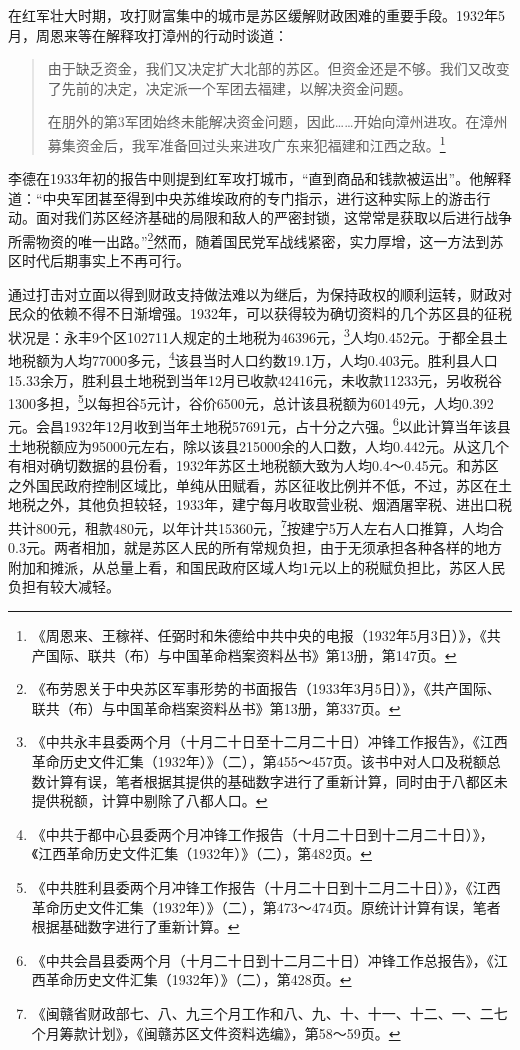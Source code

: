在红军壮大时期，攻打财富集中的城市是苏区缓解财政困难的重要手段。1932年5月，周恩来等在解释攻打漳州的行动时谈道：

\begin{quote}

由于缺乏资金，我们又决定扩大北部的苏区。但资金还是不够。我们又改变了先前的决定，决定派一个军团去福建，以解决资金问题。

在朋外的第3军团始终未能解决资金问题，因此……开始向漳州进攻。在漳州募集资金后，我军准备回过头来进攻广东来犯福建和江西之敌。\footnote{《周恩来、王稼祥、任弼时和朱德给中共中央的电报（1932年5月3日）》，《共产国际、联共（布）与中国革命档案资料丛书》第13册，第147页。}
\end{quote}


李德在1933年初的报告中则提到红军攻打城市，“直到商品和钱款被运出”。他解释道：“中央军团甚至得到中央苏维埃政府的专门指示，进行这种实际上的游击行动。面对我们苏区经济基础的局限和敌人的严密封锁，这常常是获取以后进行战争所需物资的唯一出路。”\footnote{《布劳恩关于中央苏区军事形势的书面报告（1933年3月5日）》，《共产国际、联共（布）与中国革命档案资料丛书》第13册，第337页。}然而，随着国民党军战线紧密，实力厚增，这一方法到苏区时代后期事实上不再可行。


通过打击对立面以得到财政支持做法难以为继后，为保持政权的顺利运转，财政对民众的依赖不得不日渐增强。1932年，可以获得较为确切资料的几个苏区县的征税状况是：永丰9个区102711人规定的土地税为46396元，\footnote{《中共永丰县委两个月（十月二十日至十二月二十日）冲锋工作报告》，《江西革命历史文件汇集（1932年）》（二），第455～457页。该书中对人口及税额总数计算有误，笔者根据其提供的基础数字进行了重新计算，同时由于八都区未提供税额，计算中剔除了八都人口。}人均0.452元。于都全县土地税额为人均77000多元，\footnote{《中共于都中心县委两个月冲锋工作报告（十月二十日到十二月二十日）》，《江西革命历史文件汇集（1932年）》（二），第482页。}该县当时人口约数19.1万，人均0.403元。胜利县人口15.33余万，胜利县土地税到当年12月已收款42416元，未收款11233元，另收税谷1300多担，\footnote{《中共胜利县委两个月冲锋工作报告（十月二十日到十二月二十日）》，《江西革命历史文件汇集（1932年）》（二），第473～474页。原统计计算有误，笔者根据基础数字进行了重新计算。}以每担谷5元计，谷价6500元，总计该县税额为60149元，人均0.392元。会昌1932年12月收到当年土地税57691元，占十分之六强。\footnote{《中共会昌县委两个月（十月二十日到十二月二十日）冲锋工作总报告》，《江西革命历史文件汇集（1932年）》（二），第428页。}以此计算当年该县土地税额应为95000元左右，除以该县215000余的人口数，人均0.442元。从这几个有相对确切数据的县份看，1932年苏区土地税额大致为人均0.4～0.45元。和苏区之外国民政府控制区域比，单纯从田赋看，苏区征收比例并不低，不过，苏区在土地税之外，其他负担较轻，1933年，建宁每月收取营业税、烟酒屠宰税、进出口税共计800元，租款480元，以年计共15360元，\footnote{《闽赣省财政部七、八、九三个月工作和八、九、十、十一、十二、一、二七个月筹款计划》，《闽赣苏区文件资料选编》，第58～59页。}按建宁5万人左右人口推算，人均合0.3元。两者相加，就是苏区人民的所有常规负担，由于无须承担各种各样的地方附加和摊派，从总量上看，和国民政府区域人均1元以上的税赋负担比，苏区人民负担有较大减轻。


